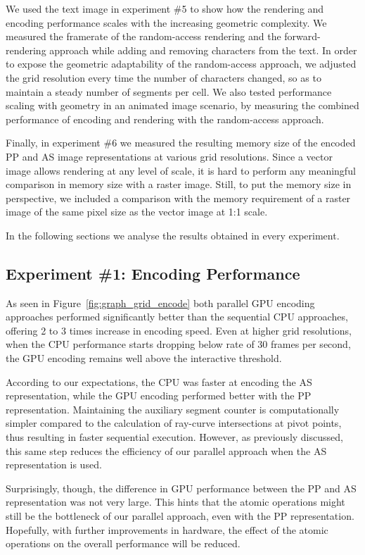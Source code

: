 \documentclass[11pt,a4paper,twoside]{article}
\begin{document}
We used the text image in experiment \#5 to show how the rendering and encoding performance scales with the increasing geometric complexity. We measured the framerate of the random-access rendering and the forward-rendering approach while adding and removing characters from the text. In order to expose the geometric adaptability of the random-access approach, we adjusted the grid resolution every time the number of characters changed, so as to maintain a steady number of segments per cell. We also tested performance scaling with geometry in an animated image scenario, by measuring the combined performance of encoding and rendering with the random-access approach.

Finally, in experiment \#6 we measured the resulting memory size of the encoded PP and AS image representations at various grid resolutions. Since a vector image allows rendering at any level of scale, it is hard to perform any meaningful comparison in memory size with a raster image. Still, to put the memory size in perspective, we included a comparison with the memory requirement of a raster image of the same pixel size as the vector image at 1:1 scale.

In the following sections we analyse the results obtained in every experiment.

\subsection {Experiment \#1: Encoding Performance}

As seen in Figure~\ref{fig:graph_grid_encode} both parallel GPU encoding approaches performed significantly better than the sequential CPU approaches, offering 2 to 3 times increase in encoding speed. Even at higher grid resolutions, when the CPU performance starts dropping below rate of 30 frames per second, the GPU encoding remains well above the interactive threshold.

According to our expectations, the CPU was faster at encoding the AS representation, while the GPU encoding performed better with the PP representation. Maintaining the auxiliary segment counter is computationally simpler compared to the calculation of ray-curve intersections at pivot points, thus resulting in faster sequential execution. However, as previously discussed, this same step reduces the efficiency of our parallel approach when the AS representation is used.

Surprisingly, though, the difference in GPU performance between the PP and AS representation was not very large. This hints that the atomic operations might still be the bottleneck of our parallel approach, even with the PP representation. Hopefully, with further improvements in hardware, the effect of the atomic operations on the overall performance will be reduced.
\end{document}
